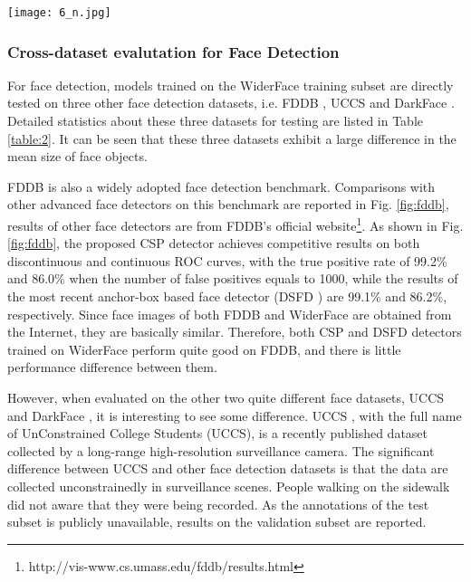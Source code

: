 \documentclass[review]{elsarticle}
\begin{document}
\begin{figure*}[t]
\begin{center}
\texttt{[image: 6\_n.jpg]}
\end{center}
   \caption{Comparisons of ROC results on the FDDB dataset.}
\label{fig:fddb}
\end{figure*}

\subsubsection{Cross-dataset evalutation for Face Detection}
For face detection, models trained on the WiderFace \cite{yang2016wider} training subset are directly tested on three other face detection datasets, i.e. FDDB \cite{fddbTech}, UCCS \cite{uccs} and DarkFace \cite{wei2018deep}. Detailed statistics about these three datasets for testing are listed in Table \ref{table:2}. It can be seen that these three datasets exhibit a large difference in the mean size of face objects.

FDDB \cite{fddbTech} is also a widely adopted face detection benchmark. Comparisons with other advanced face detectors on this benchmark are reported in Fig. \ref{fig:fddb}, results of other face detectors are from FDDB's official website\footnote{http://vis-www.cs.umass.edu/fddb/results.html}. As shown in Fig. \ref{fig:fddb}, the proposed CSP detector achieves competitive results on both discontinuous and continuous ROC curves, with the true positive rate of 99.2\% and 86.0\% when the number of false positives equals to 1000, while the results of the most recent anchor-box based face detector (DSFD \cite{li2018dsfd}) are 99.1\% and 86.2\%, respectively. Since face images of both FDDB and WiderFace are obtained from the Internet, they are basically similar. Therefore, both CSP and DSFD detectors trained on WiderFace perform quite good on FDDB, and there is little performance difference between them.

However, when evaluated on the other two quite different face datasets, UCCS \cite{uccs} and DarkFace \cite{wei2018deep}, it is interesting to see some difference.
UCCS \cite{uccs}, with the full name of UnConstrained College Students (UCCS), is a recently published dataset collected by a long-range high-resolution surveillance camera. The significant difference between UCCS \cite{uccs} and other face detection datasets is that the data are collected unconstrainedly in surveillance scenes. People walking on the sidewalk did not aware that they were being recorded. As the annotations of the test subset is publicly unavailable, results on the validation subset are reported.
\end{document}
